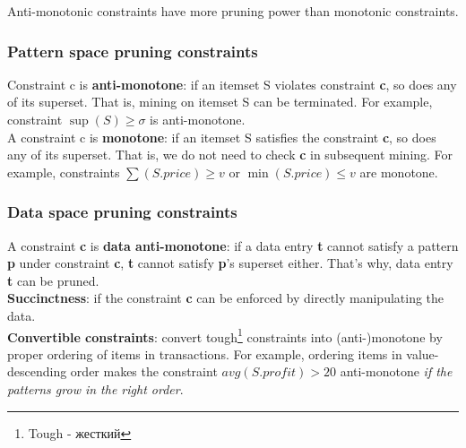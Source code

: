 Anti-monotonic constraints have more pruning power than monotonic constraints.

\subsubsection{Pattern space pruning constraints}
Constraint c is \textbf{anti-monotone}: if an itemset S violates constraint \textbf{c}, so does any of its superset. That is, mining on itemset S can be terminated. For example, constraint $\sup(S) \geqslant \sigma$ is anti-monotone.\\

A constraint c is \textbf{monotone}: if an itemset S satisfies the constraint \textbf{c}, so does any of its superset. That is, we do not need to check \textbf{c} in subsequent mining. For example, constraints $\sum(S.price) \geqslant v$ or $\min(S.price) \leqslant v$ are monotone.

\subsubsection{Data space pruning constraints}
A constraint \textbf{c} is \textbf{data anti-monotone}: if a data entry \textbf{t} cannot satisfy a pattern \textbf{p} under constraint \textbf{c}, \textbf{t} cannot satisfy \textbf{p}’s superset either. That's why, data entry \textbf{t} can be pruned.\\

\textbf{Succinctness}: if the constraint \textbf{c} can be enforced by directly manipulating the data.\\

\textbf{Convertible constraints}: convert tough\footnote{Tough - жесткий} constraints into (anti-)monotone by proper ordering of items in transactions. For example, ordering items in value-descending order makes the constraint $avg(S.profit) > 20$ anti-monotone \textit{if the patterns grow in the right order}.

